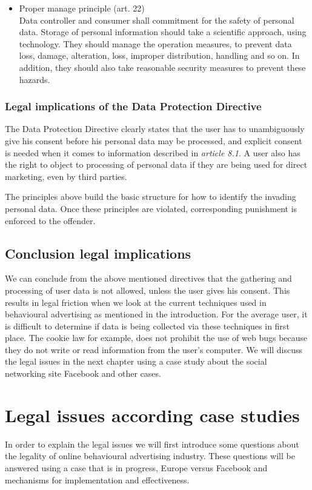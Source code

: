 \documentclass[11pt]{article}
\newcommand{\oba}{online behavioural advertising }
\newcommand{\DPD}{Data Protection Directive }
\begin{document}
\begin{itemize}
	\item Proper manage principle (art. 22)\\
Data controller and consumer shall commitment for the safety of personal data. Storage of personal information should take a scientific approach, using technology. They should manage the operation measures, to prevent data loss, damage, alteration, loss, improper distribution, handling and so on. In addition, they should also take reasonable security measures to prevent these hazards.
		

\end{itemize}

\subsubsection{Legal implications of the \DPD}
The \DPD clearly states that the user has to unambiguously give his consent before his personal data may be processed, and explicit consent is needed when it comes to information described in \textit{article 8.1}. A user also has the right to object to processing of personal data if they are being used for direct marketing, even by third parties.

The principles above build the basic structure for how to identify the invading personal data. Once these principles are violated, corresponding punishment is enforced to the offender.

\subsection{Conclusion legal implications}

We can conclude from the above mentioned directives that the gathering and processing of user data is not allowed, unless the user gives his consent. This results in legal friction when we look at the current techniques used in behavioural advertising as mentioned in the introduction. For the average user, it is difficult to determine if data is being collected via these techniques in first place. The cookie law \cite{cookielaw} for example, does not prohibit the use of web bugs because they do not write or read information from the user's computer. We will discuss the legal issues in the next chapter using a case study about the social networking site Facebook and other cases.






\section{Legal issues according case studies}
In order to explain the legal issues we will first introduce some questions about the legality of \oba industry. These questions will be answered using a case that is in progress, Europe versus Facebook and mechanisms for implementation and effectiveness.
\end{document}
